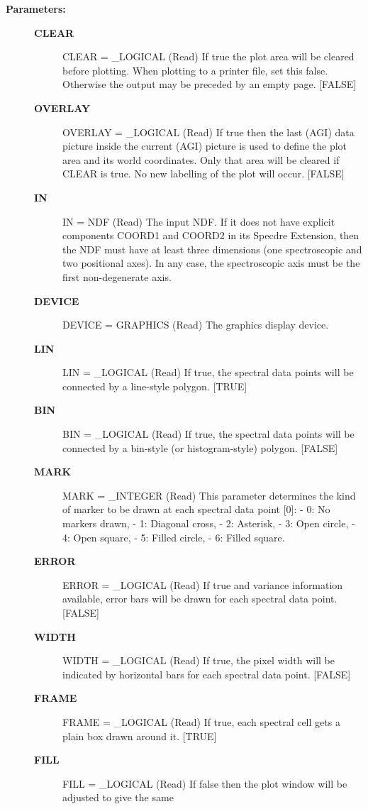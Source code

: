 \begin{description}
\item [\textbf{Parameters:}]
\begin{description}
\item [\textbf{CLEAR}]
CLEAR = \_LOGICAL (Read)
   If true the plot area will be cleared before plotting. When
   plotting to a printer file, set this false. Otherwise the
   output may be preceded by an empty page. [FALSE]
\item [\textbf{OVERLAY}]
OVERLAY = \_LOGICAL (Read)
   If true then the last (AGI) data picture inside the current
   (AGI) picture is used to define the plot area and its world
   coordinates. Only that area will be cleared if CLEAR is
   true. No new labelling of the plot will occur. [FALSE]
\item [\textbf{IN}]
IN = NDF (Read)
   The input NDF. If it does not have explicit components COORD1
   and COORD2 in its Specdre Extension, then the NDF must have at
   least three dimensions (one spectroscopic and two positional
   axes). In any case, the spectroscopic axis must be the first
   non-degenerate axis.
\item [\textbf{DEVICE}]
DEVICE = GRAPHICS (Read)
   The graphics display device.
\item [\textbf{LIN}]
LIN = \_LOGICAL (Read)
   If true, the spectral data points will be connected by a
   line-style polygon. [TRUE]
\item [\textbf{BIN}]
BIN = \_LOGICAL (Read)
   If true, the spectral data points will be connected by a
   bin-style (or histogram-style) polygon. [FALSE]
\item [\textbf{MARK}]
MARK = \_INTEGER (Read)
   This parameter determines the kind of marker to be drawn at
   each spectral data point [0]:
   -  0: No markers drawn,
   -  1: Diagonal cross,
   -  2: Asterisk,
   -  3: Open circle,
   -  4: Open square,
   -  5: Filled circle,
   -  6: Filled square.
\item [\textbf{ERROR}]
ERROR = \_LOGICAL (Read)
   If true and variance information available, error bars will be
   drawn for each spectral data point. [FALSE]
\item [\textbf{WIDTH}]
WIDTH = \_LOGICAL (Read)
   If true, the pixel width will be indicated by horizontal bars
   for each spectral data point. [FALSE]
\item [\textbf{FRAME}]
FRAME = \_LOGICAL (Read)
   If true, each spectral cell gets a plain box drawn around
   it. [TRUE]
\item [\textbf{FILL}]
FILL = \_LOGICAL (Read)
   If false then the plot window will be adjusted to give the same

\end{description}
\end{description}
